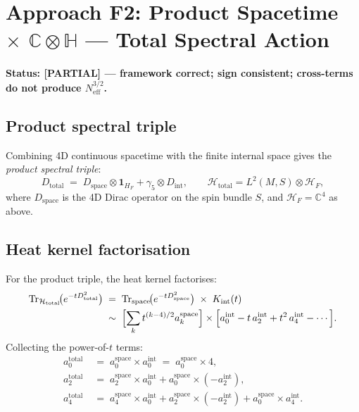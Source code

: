 \documentclass[11pt,a4paper]{article}
\theoremstyle{definition}
\theoremstyle{remark}
\begin{document}
\section{Approach F2: Product Spacetime $\times$ $\mathbb{C}\otimes\mathbb{H}$
  — Total Spectral Action}
\label{sec:F2}

\textbf{Status: [PARTIAL] — framework correct; sign consistent;
cross-terms do not produce $N_{\mathrm{eff}}^{3/2}$.}

\subsection{Product spectral triple}

Combining 4D continuous spacetime with the finite internal space gives
the \emph{product spectral triple}:
\begin{equation}
  D_{\mathrm{total}} \;=\; D_{\mathrm{space}} \otimes \mathbf{1}_{H_F}
  + \gamma_5 \otimes D_{\mathrm{int}},
  \qquad
  \mathcal{H}_{\mathrm{total}} = L^2(M, S) \otimes \mathcal{H}_F,
  \label{eq:Dtotal}
\end{equation}
where $D_{\mathrm{space}}$ is the 4D Dirac operator on the spin bundle $S$,
and $\mathcal{H}_F = \mathbb{C}^4$ as above.

\subsection{Heat kernel factorisation}

For the product triple, the heat kernel factorises:
\begin{align}
  \mathrm{Tr}_{\mathcal{H}_{\mathrm{total}}}\!\bigl(e^{-t D_{\mathrm{total}}^2}\bigr)
  &\;=\; \mathrm{Tr}_{\mathrm{space}}\!\bigl(e^{-t D_{\mathrm{space}}^2}\bigr)
    \;\times\; K_{\mathrm{int}}(t)  \notag\\
  &\;\sim\; \Bigl[\sum_{k} t^{(k-4)/2} a_k^{\mathrm{space}}\Bigr]
    \times \Bigl[a_0^{\mathrm{int}} - t\,a_2^{\mathrm{int}} + t^2\,a_4^{\mathrm{int}} - \cdots\Bigr].
    \label{eq:product_HK}
\end{align}
Collecting the power-of-$t$ terms:
\begin{align}
  a_0^{\mathrm{total}} &\;=\; a_0^{\mathrm{space}} \times a_0^{\mathrm{int}}
    \;=\; a_0^{\mathrm{space}} \times 4, \label{eq:a0total}\\
  a_2^{\mathrm{total}} &\;=\; a_2^{\mathrm{space}} \times a_0^{\mathrm{int}}
    + a_0^{\mathrm{space}} \times (-a_2^{\mathrm{int}}),
    \label{eq:a2total}\\
  a_4^{\mathrm{total}} &\;=\; a_4^{\mathrm{space}} \times a_0^{\mathrm{int}}
    + a_2^{\mathrm{space}} \times (-a_2^{\mathrm{int}})
    + a_0^{\mathrm{space}} \times a_4^{\mathrm{int}}.
    \label{eq:a4total}
\end{align}
\end{document}
